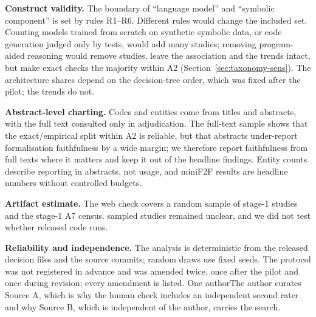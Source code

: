 \textbf{Construct validity.} The boundary of ``language model'' and ``symbolic component'' is set by rules R1--R6. Different rules would change the included set. Counting models trained from scratch on synthetic symbolic data, or code generation judged only by tests, would add many studies; removing program-aided reasoning would remove  studies, leave the association and the trends intact, but make exact checks the majority within A2 (Section~\ref{sec:taxonomy-sens}). The architecture shares depend on the decision-tree order, which was fixed after the pilot; the trends do not.

\textbf{Abstract-level charting.} Codes and entities come from titles and abstracts, with the full text consulted only in adjudication. The full-text sample shows that the exact/empirical split within A2 is reliable, but that abstracts under-report formalisation faithfulness by a wide margin; we therefore report faithfulness from full texts where it matters and keep it out of the headline findings. Entity counts describe reporting in abstracts, not usage, and miniF2F results are headline numbers without controlled budgets.

\textbf{Artifact estimate.} The web check covers a random sample of  stage-1 studies and the stage-1 A7 census.  sampled studies remained unclear, and we did not test whether released code runs.

\textbf{Reliability and independence.} The analysis is deterministic from the released decision files and the source commits; random draws use fixed seeds. The protocol was not registered in advance and was amended twice, once after the pilot and once during revision; every amendment is listed. \ifanonymous One author\else The author\fi{} curates Source A, which is why the human check includes an independent second rater and why Source B, which is independent of the author, carries the search.

